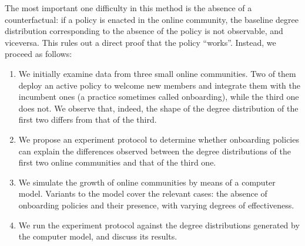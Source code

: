 The most important one difficulty in this method is the absence of a counterfactual: if a policy is enacted in the online community, the baseline degree distribution corresponding to the absence of the policy is not observable, and viceversa. This rules out a direct proof that the policy “works”. Instead, we proceed as follows: 

\begin{enumerate}
\item We initially examine data from three small online communities. Two of them deploy an active policy to welcome new members and integrate them with the incumbent ones (a practice sometimes called onboarding), while the third one does not. We observe that, indeed, the shape of the degree distribution of the first two differs from that of the third.  
\item We propose an experiment protocol to determine whether onboarding policies can explain the differences observed between the degree distributions of the first two online communities and that of the third one. 
\item We simulate the growth of online communities by means of a computer model. Variants to the model cover the relevant cases: the absence of onboarding policies and their presence, with varying degrees of effectiveness. 
\item We run the experiment protocol against the degree distributions generated by the computer model, and discuss its results.
\end{enumerate}